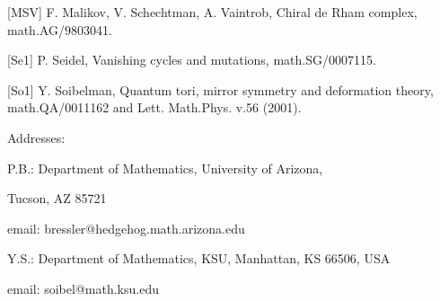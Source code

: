 \documentclass[a4paper,12pt]{article}
\begin{document}
\vspace{2mm}

[MSV] F. Malikov, V. Schechtman, A. Vaintrob, Chiral de Rham complex,
math.AG/9803041.

\vspace{2mm}

[Se1] P. Seidel, Vanishing cycles and mutations, math.SG/0007115.

\vspace{2mm}

[So1] Y. Soibelman, Quantum tori, mirror symmetry and deformation
theory, math.QA/0011162 and Lett. Math.Phys. v.56 (2001).


\vspace{3mm}


Addresses: 

P.B.:  Department of Mathematics, University of Arizona, 

Tucson, AZ 85721

{email: bressler@hedgehog.math.arizona.edu}

\vspace{2mm}

Y.S.: Department of Mathematics, KSU, Manhattan, KS 66506, USA

{email: soibel@math.ksu.edu}
\end{document}
